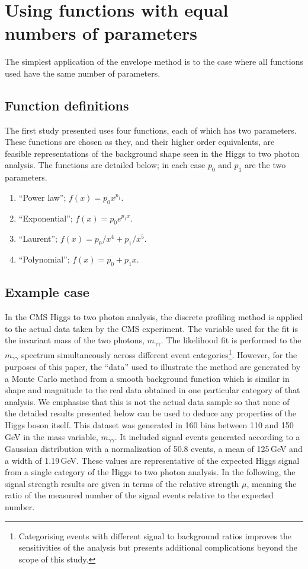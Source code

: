\section{Using functions with equal numbers of parameters} %
\label{sec:functions}

The simplest application of the envelope method is to the case where all
functions used have the same number of parameters.

\subsection{Function definitions}
\label{sec:functions:function}

The first study presented uses four functions, each of which has two parameters.
These functions are chosen as they, and their higher order equivalents,
are feasible representations of the background shape seen in the Higgs to two photon
analysis. The functions are detailed below; in each case $p_0$ and $p_1$ are
the two parameters.
\begin{enumerate}
\item
``Power law''; $f(x) = p_0 x^{p_1}$.
\item
``Exponential''; $f(x) = p_0 e^{p_1x}$.
\item
``Laurent''; $f(x) = p_0/x^4 + p_1/x^5$.
\item
``Polynomial''; $f(x) = p_0 + p_1 x$.
\end{enumerate}

\subsection{Example case}
\label{sec:functions:example}

In the CMS Higgs to two photon analysis, the discrete profiling method is applied to
the actual data taken by the CMS experiment. The variable used for the fit is the invariant mass of the two photons, $m_{\gamma\gamma}$.
The likelihood fit is performed to the $m_{\gamma\gamma}$ spectrum simultaneously
across different event categories\footnote{Categorising events with different signal to background ratios improves the sensitivities
of the analysis but presents additional complications beyond the scope of this study.}.
However, for the purposes of this
paper, the ``data'' used to illustrate the method are generated by a Monte Carlo
method from a smooth background
function which is similar in shape and magnitude to the
real data obtained in one particular category of that analysis. We emphasise that this is not the
actual data sample so that none of the detailed results presented below can be used to deduce any
properties of the Higgs boson itself.
This dataset was generated in 160 bins between 110 and 150\,GeV in
the mass variable, $m_{\gamma\gamma}$.
It included signal events
generated according to a Gaussian distribution with a normalization of 50.8 events, a mean of 125\,GeV and a
width of 1.19\,GeV. These values are representative of the expected Higgs signal from a single category of the
Higgs to two photon analysis.
In the following, the signal strength results are given in
terms of the relative strength $\mu$,
meaning the ratio of the measured number of the signal events relative
to the expected number.

